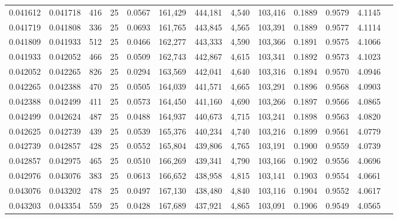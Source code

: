 \begin{tabular}{rrrrrrrrrrrrr}
0.041612 & 0.041718 &   416 &  25 &                                     0.0567 & 161,429 & 444,181 &   4,540 & 103,416 & 0.1889 & 0.9579 & 4.1145 \\
0.041719 & 0.041808 &   336 &  25 &                                     0.0693 & 161,765 & 443,845 &   4,565 & 103,391 & 0.1889 & 0.9577 & 4.1114 \\
0.041809 & 0.041933 &   512 &  25 &                                     0.0466 & 162,277 & 443,333 &   4,590 & 103,366 & 0.1891 & 0.9575 & 4.1066 \\
0.041933 & 0.042052 &   466 &  25 &                                     0.0509 & 162,743 & 442,867 &   4,615 & 103,341 & 0.1892 & 0.9573 & 4.1023 \\
0.042052 & 0.042265 &   826 &  25 &                                     0.0294 & 163,569 & 442,041 &   4,640 & 103,316 & 0.1894 & 0.9570 & 4.0946 \\
0.042265 & 0.042388 &   470 &  25 &                                     0.0505 & 164,039 & 441,571 &   4,665 & 103,291 & 0.1896 & 0.9568 & 4.0903 \\
0.042388 & 0.042499 &   411 &  25 &                                     0.0573 & 164,450 & 441,160 &   4,690 & 103,266 & 0.1897 & 0.9566 & 4.0865 \\
0.042499 & 0.042624 &   487 &  25 &                                     0.0488 & 164,937 & 440,673 &   4,715 & 103,241 & 0.1898 & 0.9563 & 4.0820 \\
0.042625 & 0.042739 &   439 &  25 &                                     0.0539 & 165,376 & 440,234 &   4,740 & 103,216 & 0.1899 & 0.9561 & 4.0779 \\
0.042739 & 0.042857 &   428 &  25 &                                     0.0552 & 165,804 & 439,806 &   4,765 & 103,191 & 0.1900 & 0.9559 & 4.0739 \\
0.042857 & 0.042975 &   465 &  25 &                                     0.0510 & 166,269 & 439,341 &   4,790 & 103,166 & 0.1902 & 0.9556 & 4.0696 \\
0.042976 & 0.043076 &   383 &  25 &                                     0.0613 & 166,652 & 438,958 &   4,815 & 103,141 & 0.1903 & 0.9554 & 4.0661 \\
0.043076 & 0.043202 &   478 &  25 &                                     0.0497 & 167,130 & 438,480 &   4,840 & 103,116 & 0.1904 & 0.9552 & 4.0617 \\
0.043203 & 0.043354 &   559 &  25 &                                     0.0428 & 167,689 & 437,921 &   4,865 & 103,091 & 0.1906 & 0.9549 & 4.0565 \\

\end{tabular}
